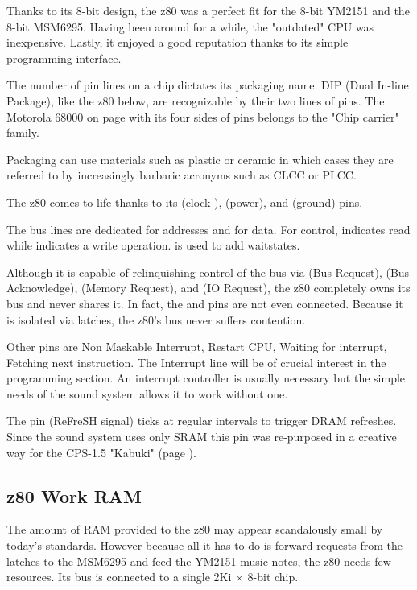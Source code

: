 Thanks to its 8-bit design, the z80 was a perfect fit for the 8-bit YM2151 and the 8-bit MSM6295. Having been around for a while, the "outdated" CPU was inexpensive. Lastly, it enjoyed a good reputation thanks to its simple programming interface.

\begin{trivia}
The number of pin lines on a chip dictates its packaging name. DIP (Dual In-line Package), like the z80 below, are recognizable by their two lines of pins. The Motorola 68000 on page \pageref{68000drawing} with its four sides of pins belongs to the "Chip carrier" family. 

Packaging can use materials such as plastic or ceramic in which cases they are referred to by increasingly barbaric acronyms such as CLCC or PLCC.
\end{trivia}


The z80 comes to life thanks to its  (clock ),  (power), and  (ground) pins.

The bus lines are dedicated  for addresses and  for data. For control,  indicates read while  indicates a write operation.  is used to add waitstates. 

Although it is capable of relinquishing control of the bus via  (Bus Request),  (Bus Acknowledge),  (Memory Request), and  (IO Request), the z80 completely owns its bus and never shares it. In fact, the  and  pins are not even connected.  Because it is isolated via latches, the z80's bus never suffers contention.


Other pins are  Non Maskable Interrupt,  Restart CPU,  Waiting for interrupt,  Fetching next instruction. The  Interrupt line will be of crucial interest in the programming section. An interrupt controller is usually necessary but the simple needs of the sound system allows it to work without one. 

\label{z80_pinRFSH}
The  pin (ReFreSH signal) ticks at regular intervals to trigger DRAM refreshes. Since the sound system uses only SRAM this pin was re-purposed in a creative way for the CPS-1.5 "Kabuki" (page \pageref{kabuki}).


\pagebreak

\subsection{z80 Work RAM}
The amount of RAM provided to the z80 may appear scandalously small by today's standards. However because all it has to do is forward requests from the latches to the MSM6295 and feed the YM2151 music notes, the z80 needs few resources. Its bus is connected to a single 2Ki $\times$ 8-bit  chip.

